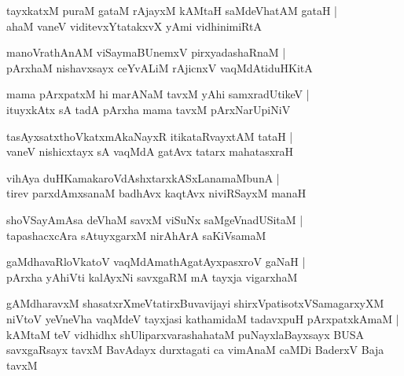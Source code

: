 \documentclass[twoside,12pt,openright]{book}
\newcounter{shloka}[chapter]
\begin{document}
\begin{shloka}%
tayxkatxM puraM gataM rAjayxM kAMtaH saMdeVhatAM gataH |\\
ahaM vaneV viditevxYtatakxvX yAmi vidhinimiRtA 
\end{shloka}

\begin{shloka}%
manoVrathAnAM viSaymaBUnemxV pirxyadashaRnaM |\\
pArxhaM nishavxsayx ceYvALiM rAjicnxV vaqMdAtiduHKitA 
\end{shloka}

\begin{shloka}%
mama pArxpatxM hi marANaM tavxM yAhi samxradUtikeV |\\
ituyxkAtx sA tadA pArxha mama tavxM pArxNarUpiNiV 
\end{shloka}

\begin{shloka}%
tasAyxsatxthoVkatxmAkaNayxR itikataRvayxtAM tataH |\\
vaneV nishicxtayx sA vaqMdA gatAvx tatarx mahatasxraH 
\end{shloka}

\begin{shloka}%
vihAya duHKamakaroVdAshxtarxkASxLanamaMbunA |\\
tirev parxdAmxsanaM badhAvx kaqtAvx niviRSayxM manaH 
\end{shloka}

\begin{shloka}%
shoVSayAmAsa deVhaM savxM viSuNx saMgeVnadUSitaM |\\
tapashacxcAra sAtuyxgarxM nirAhArA saKiVsamaM 
\end{shloka}

\begin{shloka}%
gaMdhavaRloVkatoV vaqMdAmathAgatAyxpasxroV gaNaH |\\
pArxha yAhiVti kalAyxNi savxgaRM mA tayxja vigarxhaM 
\end{shloka}

\begin{shloka}%
gAMdharavxM shasatxrXmeVtatirxBuvavijayi shirxVpatisotxVSamagarxyXM \\
niVtoV yeVneVha vaqMdeV tayxjasi kathamidaM tadavxpuH pArxpatxkAmaM |\\
kAMtaM teV vidhidhx shUliparxvarashahataM puNayxlaBayxsayx BUSA \\
savxgaRsayx tavxM BavAdayx durxtagati ca vimAnaM caMDi BaderxV Baja tavxM 
\end{shloka}
\end{document}
